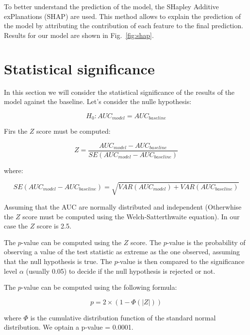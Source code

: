 \documentclass[a4paper,12pt]{article}
\begin{document}
To better understand the prediction of the model, the SHapley Additive exPlanations (SHAP) \cite{lundbergExplainableMachinelearningPredictions2018} are used. This method allows to explain the prediction of the model by attributing the contribution of each feature to the final prediction. Results for our model are shown in Fig.~\ref{fig:shap}.


\section{Statistical significance}

In this section we will consider the statistical significance of the results of the model against the baseline. Let's consider the nulle hypothesis:

\begin{equation}
    H_0: AUC_{model} = AUC_{baseline}
\end{equation}

Firs the $Z$ score must be computed:

\begin{equation}
    Z = \frac{AUC_{model} - AUC_{baseline}}{SE(AUC_{model} - AUC_{baseline})}
\end{equation}

where:

\begin{equation}
    SE(AUC_{model} - AUC_{baseline}) = \sqrt{VAR(AUC_{model}) + VAR(AUC_{baseline})}
\end{equation}

Assuming that the AUC are normally distributed and independent (Otherwhise the $Z$ score must be computed using the Welch-Satterthwaite equation). In our case the $Z$ score is 2.5. \medskip

The $p$-value can be computed using the $Z$ score. The $p$-value is the probability of observing a value of the test statistic as extreme as the one observed, assuming that the null hypothesis is true. The $p$-value is then compared to the significance level $\alpha$ (usually 0.05) to decide if the null hypothesis is rejected or not. \medskip

The $p$-value can be computed using the following formula:

\begin{equation}
    p = 2 \times (1 - \Phi(|Z|))
\end{equation}

where $\Phi$ is the cumulative distribution function of the standard normal distribution. We optain a p-value = 0.0001.\medskip





 
\end{document}
